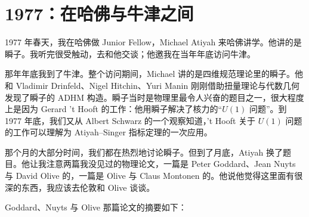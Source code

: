 \section{1977：在哈佛与牛津之间}

\par\medskip

1977 年春天，我在哈佛做 Junior Fellow，Michael Atiyah 来哈佛讲学。他讲的是瞬子。我听完很受触动，去和他交谈；他邀我在当年年底访问牛津。

那年年底我到了牛津。整个访问期间，Michael 讲的是四维规范理论里的瞬子。他和 Vladimir Drinfeld、Nigel Hitchin、Yuri Manin 刚刚借助扭量理论与代数几何发现了瞬子的 ADHM 构造。瞬子当时是物理里最令人兴奋的题目之一，很大程度上是因为 Gerard 't Hooft 的工作：他用瞬子解决了核力的“$U(1)$ 问题”。到 1977 年底，我们又从 Albert Schwarz 的一个观察知道，'t Hooft 关于 $U(1)$ 问题的工作可以理解为 Atiyah--Singer 指标定理的一次应用。

那个月的大部分时间，我们都在热烈地讨论瞬子。但到了月底，Atiyah 换了题目。他让我注意两篇我没见过的物理论文，一篇是 Peter Goddard、Jean Nuyts 与 David Olive 的，一篇是 Olive 与 Claus Montonen 的。他说他觉得这里面有很深的东西，我应该去伦敦和 Olive 谈谈。

Goddard、Nuyts 与 Olive 那篇论文的摘要如下：

